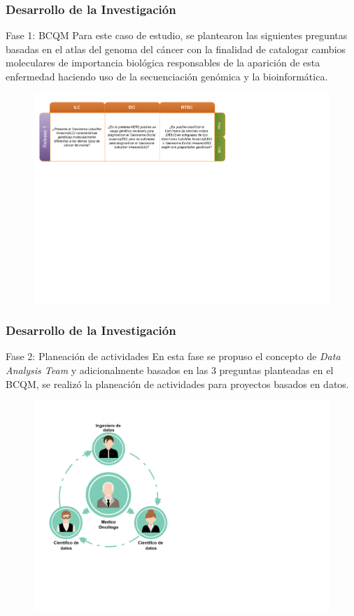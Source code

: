 \documentclass[xcolor=dvipsnames,xcolor=table,10pt]{beamer} %
\begin{document}
\begin{frame}
	\frametitle{Desarrollo de la Investigación}
	\begin{block}{Fase 1: BCQM}\justifying
	Para este caso de estudio, se plantearon las siguientes preguntas  basadas en el atlas del genoma del cáncer con la finalidad de catalogar cambios moleculares de importancia biológica responsables de la aparición de esta enfermedad haciendo uso de la secuenciación genómica y la bioinformática.

	\end{block}
	
	\begin{figure}[h!]
		\centering
		\includegraphics[width=0.93\linewidth]{IMAGENES/BCQM_TCGA}
	\end{figure}
\end{frame}

\begin{frame}
	\frametitle{Desarrollo de la Investigación}
	\begin{block}{Fase 2: Planeación de actividades}\justifying
	En esta fase se propuso el concepto de \textit{Data Analysis Team}  y adicionalmente basados en las 3 preguntas planteadas en el BCQM, se realizó la planeación de actividades para proyectos basados en datos.
	
	\end{block}
	
	\begin{figure}[h!]
		\centering
		\includegraphics[width=0.42\linewidth]{IMAGENES/Data_Analysis_Team}
	\end{figure}
\end{frame}
\end{document}
